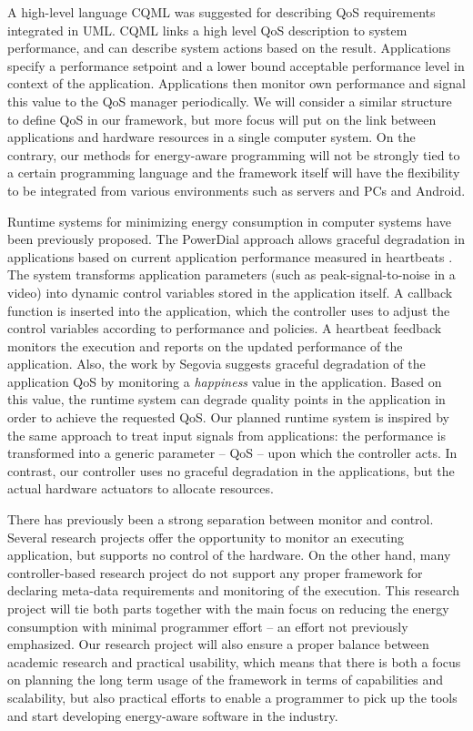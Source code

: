 \documentclass{article}
\begin{document}
A high-level language CQML \cite{Aagedal:01} was suggested for describing QoS requirements integrated in UML. 
CQML links a high level QoS description to system performance, and can describe system actions based on the result. 
Applications specify a performance setpoint and a lower bound acceptable performance level in context of the application. 
Applications then monitor own performance and signal this value to the QoS manager periodically. 
We will consider a similar structure to define QoS in our framework, but more focus will put on the link between applications and hardware resources in a single computer system.
On the contrary, our methods for energy-aware programming will not be strongly tied to a certain programming language and the framework itself will have the flexibility to be integrated from various environments such as servers and PCs and Android.\smallskip

Runtime systems for minimizing energy consumption in computer systems have been previously proposed.
The PowerDial \cite{Hoffmann:11} approach allows graceful degradation in applications based on current application performance measured in heartbeats \cite{Hoffmann:10}. 
The system transforms application parameters (such as peak-signal-to-noise in a video) into dynamic control variables stored in the application itself. 
A callback function is inserted into the application, which the controller uses to adjust the control variables according to performance and policies.
A heartbeat feedback monitors the execution and reports on the updated performance of the application. 
Also, the work by Segovia \cite{Segovia:11} suggests graceful degradation of the application QoS by monitoring a \textit{happiness} value in the application. 
Based on this value, the runtime system can degrade quality points in the application in order to achieve the requested QoS. 
Our planned runtime system is inspired by the same approach to treat input signals from applications: the performance is transformed into a generic parameter – QoS – upon which the controller acts.
In contrast, our controller uses no graceful degradation in the applications, but the actual hardware actuators to allocate resources.\smallskip

There has previously been a strong separation between monitor and control.
Several research projects offer the opportunity to monitor an executing application, but supports no control of the hardware.
On the other hand, many controller-based research project do not support any proper framework for declaring meta-data requirements and monitoring of the execution.
This research project will tie both parts together with the main focus on reducing the energy consumption with minimal programmer effort -- an effort not previously emphasized.
Our research project will also ensure a proper balance between academic research and practical usability,
which means that there is both a focus on planning the long term usage of the framework in terms of capabilities and scalability, but also practical efforts to enable a programmer to pick up the tools and start developing energy-aware software in the industry.
\end{document}

